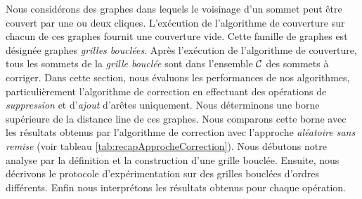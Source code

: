 Nous consid\'erons des graphes dans lequels le voisinage d'un sommet peut \^etre couvert par  une ou deux cliques. L'ex\'ecution de l'algorithme de couverture sur chacun de ces graphes fournit une couverture vide. Cette famille de graphes est d\'esign\'ee graphes {\em grilles boucl\'ees}. Apr\`es l'ex\'ecution de l'algorithme de couverture, tous les sommets de la {\em grille boucl\'ee} sont dans l'ensemble $\cal C$ des sommets \`a corriger.
\newline
Dans cette section, nous \'evaluons les performances de nos algorithmes, particuli\`erement l'algorithme de correction en effectuant  des op\'erations de {\em suppression } et d'{\em ajout} d'ar\^etes uniquement.
Nous d\'eterminons une borne sup\'erieure de la distance line de ces graphes.
Nous comparons cette borne avec les r\'esultats obtenus par l'algorithme de correction avec l'approche {\em al\'eatoire sans remise} (voir tableau \ref{tab:recapApprocheCorrection}).
\newline
 Nous d\'ebutons notre analyse par la d\'efinition et la construction d'une grille boucl\'ee. Ensuite, nous d\'ecrivons le protocole d'exp\'erimentation sur des grilles boucl\'ees d'ordres diff\'erents. Enfin nous interpr\'etons les r\'esultats obtenus pour chaque op\'eration.